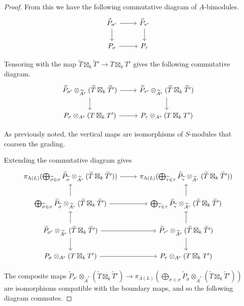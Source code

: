\documentclass{amsart}
\newcommand{\field}{k}
\theoremstyle{remark}
\begin{document}
\begin{proof}
  From this we have the following commutative diagram of $A$-bimodules.
  \[\begin{tikzcd}
    \widetilde{P}_{\sigma'} \arrow[r] \arrow[d] & \widetilde{P}_{\tau'} \arrow[d]\\
    P_\sigma\arrow[r] & P_{\tau}
  \end{tikzcd}\]

  Tensoring with the map $\widetilde{T}\boxtimes_{\field}\widetilde{T}'\rightarrow T\boxtimes_{\field} T'$ gives the following commutative diagram.
  \[\begin{tikzcd}
    \widetilde{P}_{\sigma'} \otimes_{\widetilde{A}^e} (\widetilde{T}\boxtimes_{\field}\widetilde{T}')  \arrow[r] \arrow[d] & \widetilde{P}_{\tau'} \otimes_{\widetilde{A}^e} (\widetilde{T}\boxtimes_{\field}\widetilde{T}')\arrow[d]\\
    P_\sigma \otimes_{A^e} (T\boxtimes_{\field} T') \arrow[r] & P_{\tau} \otimes_{A^e} (T\boxtimes_{\field} T')
  \end{tikzcd}\]

  As previously noted, the vertical maps are isomorphisms of $S$-modules that coarsen the grading.

  Extending the commutative diagram gives
  \[\begin{tikzcd}
  \pi_{\Lambda(L)}(\bigoplus_{\widetilde{\sigma}\in \sigma} \widetilde{P}_{\widetilde{\sigma}} \otimes_{\widetilde{A}^e} (\widetilde{T}\boxtimes_{\field}\widetilde{T}'))  \arrow[r] & \pi_{\Lambda(L)}(\bigoplus_{\widetilde{\tau}\in \tau} \widetilde{P}_{\widetilde{\tau}} \otimes_{\widetilde{A}^e} (\widetilde{T}\boxtimes_{\field}\widetilde{T}'))\\
  \bigoplus_{\widetilde{\sigma}\in \sigma} \widetilde{P}_{\widetilde{\sigma}} \otimes_{\widetilde{A}^e} (\widetilde{T}\boxtimes_{\field}\widetilde{T}')  \arrow[r] \arrow[u] & \bigoplus_{\widetilde{\tau}\in \tau} \widetilde{P}_{\widetilde{\tau}} \otimes_{\widetilde{A}^e} (\widetilde{T}\boxtimes_{\field}\widetilde{T}') \arrow[u]\\
  \widetilde{P}_{\sigma'} \otimes_{\widetilde{A}^e} (\widetilde{T}\boxtimes_{\field}\widetilde{T}')  \arrow[r] \arrow[d] \arrow[u] & \widetilde{P}_{\tau'} \otimes_{\widetilde{A}^e} (\widetilde{T}\boxtimes_{\field}\widetilde{T}')\arrow[d] \arrow[u]\\
  P_\sigma \otimes_{A^e} (T\boxtimes_{\field} T') \arrow[r] & P_{\tau} \otimes_{A^e} (T\boxtimes_{\field} T')
  \end{tikzcd}\]

  The composite maps $ \widetilde{P}_{\sigma'} \otimes_{\widetilde{A}^e} (\widetilde{T}\boxtimes_{\field}\widetilde{T}')\rightarrow \pi_{\Lambda(L)}(\bigoplus_{\widetilde{\sigma}\in \sigma} \widetilde{P}_{\widetilde{\sigma}} \otimes_{\widetilde{A}^e} (\widetilde{T}\boxtimes_{\field}\widetilde{T}'))$ are isomorphisms compatible with the boundary maps, and so the following diagram commutes.


\end{proof}
\end{document}
